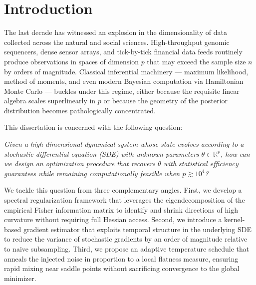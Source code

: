 \chapter{Introduction}

The last decade has witnessed an explosion in the dimensionality of data collected across the natural and social sciences. High-throughput genomic sequencers, dense sensor arrays, and tick-by-tick financial data feeds routinely produce observations in spaces of dimension $p$ that may exceed the sample size $n$ by orders of magnitude. Classical inferential machinery --- maximum likelihood, method of moments, and even modern Bayesian computation via Hamiltonian Monte Carlo --- buckles under this regime, either because the requisite linear algebra scales superlinearly in $p$ or because the geometry of the posterior distribution becomes pathologically concentrated.

This dissertation is concerned with the following question:

\begin{quotebox}
\noindent\textit{Given a high-dimensional dynamical system whose state evolves according to a stochastic differential equation (SDE) with unknown parameters $\theta \in \mathbb{R}^{p}$, how can we design an optimization procedure that recovers $\theta$ with statistical efficiency guarantees while remaining computationally feasible when $p \gtrsim 10^{4}$?}
\end{quotebox}

\noindent We tackle this question from three complementary angles. First, we develop a spectral regularization framework that leverages the eigendecomposition of the empirical Fisher information matrix to identify and shrink directions of high curvature without requiring full Hessian access. Second, we introduce a kernel-based gradient estimator that exploits temporal structure in the underlying SDE to reduce the variance of stochastic gradients by an order of magnitude relative to naive subsampling. Third, we propose an adaptive temperature schedule that anneals the injected noise in proportion to a local flatness measure, ensuring rapid mixing near saddle points without sacrificing convergence to the global minimizer.
